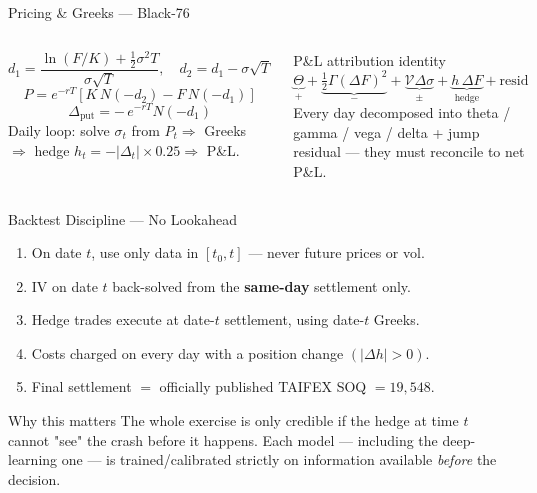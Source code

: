 \documentclass[aspectratio=169,t]{beamer}
\begin{document}
\begin{frame}{Pricing \& Greeks --- Black-76}
  \begin{columns}[T]
      \[ d_1=\frac{\ln(F/K)+\tfrac12\sigma^2 T}{\sigma\sqrt T},\quad d_2=d_1-\sigma\sqrt T \]
      \[ P = e^{-rT}\!\left[K\,N(-d_2)-F\,N(-d_1)\right] \]
      \[ \Delta_{\text{put}} = -\,e^{-rT}N(-d_1) \]
      \vspace{0.2em}
      {\small Daily loop: solve $\sigma_t$ from $P_t \Rightarrow$ Greeks $\Rightarrow$ hedge $h_t=-|\Delta_t|\times0.25 \Rightarrow$ P\&L.}
      \begin{block}{P\&L attribution identity}
        \small
        \[
        \underbrace{\Theta}_{+}+\underbrace{\tfrac12\Gamma(\Delta F)^2}_{-}+\underbrace{\mathcal{V}\Delta\sigma}_{\pm}+\underbrace{h\,\Delta F}_{\text{hedge}}+\text{resid}
        \]
        Every day decomposed into theta / gamma / vega / delta + jump residual --- they must reconcile to net P\&L.
      \end{block}
  \end{columns}
\end{frame}

\begin{frame}{Backtest Discipline --- No Lookahead}
  \begin{enumerate}
    \item On date $t$, use only data in $[t_0,t]$ --- never future prices or vol.
    \item IV on date $t$ back-solved from the \textbf{same-day} settlement only.
    \item Hedge trades execute at date-$t$ settlement, using date-$t$ Greeks.
    \item Costs charged on every day with a position change $(|\Delta h|>0)$.
    \item Final settlement $=$ officially published TAIFEX SOQ $=19{,}548$.
  \end{enumerate}
  \vspace{0.4em}
  \begin{exampleblock}{Why this matters}
    The whole exercise is only credible if the hedge at time $t$ cannot "see" the crash before it happens. Each model --- including the deep-learning one --- is trained/calibrated strictly on information available \emph{before} the decision.
  \end{exampleblock}
\end{frame}

\end{document}
